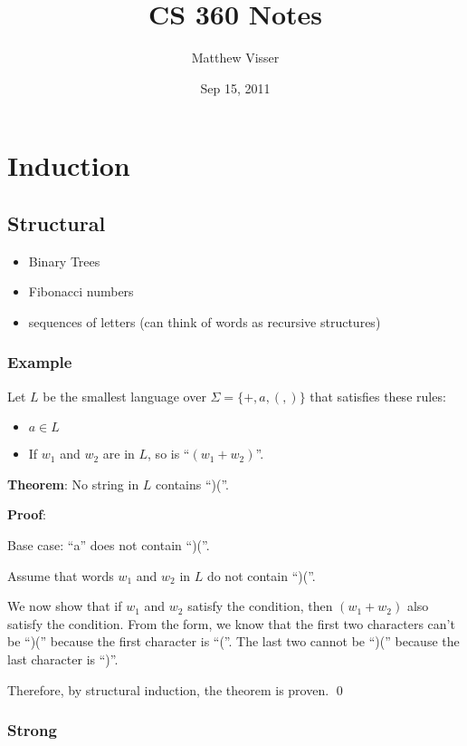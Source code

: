 \documentclass[12pt]{article}
\begin{document}
\title{CS 360 Notes}
\author{Matthew Visser}
\date{Sep 15, 2011}
\maketitle

\section{Induction}

\subsection{ Structural}
\begin{itemize}
    \item Binary Trees
    \item Fibonacci numbers
    \item sequences of letters (can think of words as recursive
        structures)
\end{itemize}

\subsubsection{Example}

Let $L$ be the smallest language over $\Sigma = \{+,a,(,)\}$ that satisfies
these rules:
\begin{itemize}
    \item $a \in L$
    \item If $w_1$ and $w_2$ are in $L$, so is ``$(w_1 + w_2)$''.
\end{itemize}

\textbf{Theorem}: No string in $L$ contains ``)(''.

\textbf{Proof}:

Base case: ``a'' does not contain ``)(''.

Assume that words $w_1$ and $w_2$ in $L$ do not contain ``)(''.

We now show that if $w_1$ and $w_2$ satisfy the condition, then $(w_1 + w_2)$
also satisfy the condition. From the form, we know that the first two characters
can't be ``)('' because the first character is ``(''. The last two cannot be
``)('' because the last character is ``)''.

Therefore, by structural induction, the theorem is proven. \qed

\subsubsection{ Strong}
\end{document}
